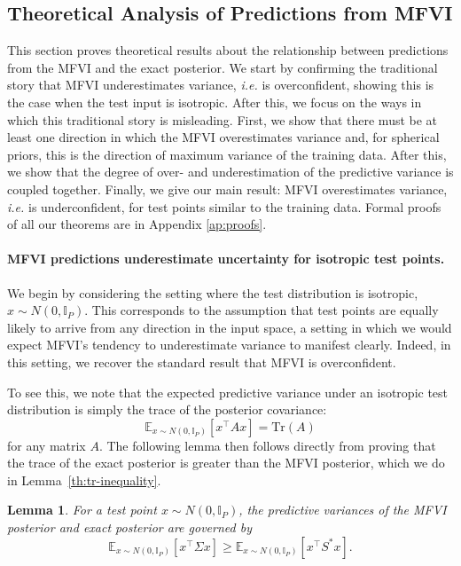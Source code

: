 \documentclass{article}
\theoremstyle{plain}
\newtheorem{lemma}[theorem]{Lemma}
\theoremstyle{definition}
\theoremstyle{remark}
\theoremstyle{plain}
\newcommand{\I}{\mathbb{I}}
\newcommand{\expectation}[2]{\mathbb{E}_{#1}\left[#2\right]}
\newcommand{\posterior}{\Sigma}
\newcommand{\Tr}[1]{\text{Tr}\left(#1\right)}
\begin{document}
\subsection{Theoretical Analysis of Predictions from MFVI}
This section proves theoretical results about the relationship between predictions from the MFVI and the exact posterior. 
We start by confirming the traditional story that MFVI underestimates variance, \textit{i.e.} is overconfident, showing this is the case when the test input is isotropic. 
After this, we focus on the ways in which this traditional story is misleading. First, we show that there must be at least one direction in which the MFVI overestimates variance and, for spherical priors, this is the direction of maximum variance of the training data. After this, we show that the degree of over- and underestimation of the predictive variance is coupled together. Finally, we give our main result: MFVI overestimates variance, \textit{i.e.} is underconfident, for test points similar to the training data.
Formal proofs of all our theorems are in Appendix \ref{ap:proofs}. 

\paragraph{MFVI predictions underestimate uncertainty for isotropic test points.}  We begin by considering the setting where the test distribution is isotropic, $x \sim N(0, \I_P)$. This corresponds to the assumption that test points are equally likely to arrive from any direction in the input space, a setting in which we would expect MFVI's tendency to underestimate variance to manifest clearly. Indeed, in this setting, we recover the standard result that MFVI is overconfident.

To see this, we note that the expected predictive variance under an isotropic test distribution is simply the trace of the posterior covariance:
\begin{equation}
    \expectation{x \sim N(0, \I_P)}{x^\top A x} = \Tr{A}
\end{equation}
for any matrix $A$. The following lemma then follows directly from proving that the trace of the exact posterior is greater than the MFVI posterior, which we do in  Lemma~\ref{th:tr-inequality}.
\begin{lemma}
    \label{th:isotropic-pred-var}
    For a test point $x\sim N(0, \I_P)$, the predictive variances of the MFVI posterior and exact posterior are governed by 
    \begin{equation}
        \expectation{x\sim N(0, \I_P)}{x^\top \posterior x} \geq \expectation{x\sim N(0, \I_P)}{x^\top S^* x}.
    \end{equation}
\end{lemma}
\end{document}
